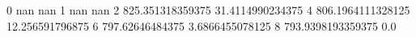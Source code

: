 0 nan nan
1 nan nan
2 825.351318359375 31.4114990234375
4 806.1964111328125 12.256591796875
6 797.62646484375 3.6866455078125
8 793.9398193359375 0.0
